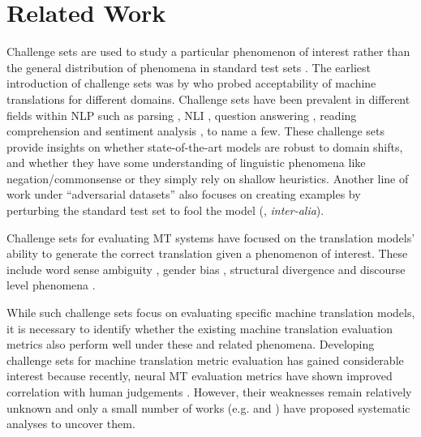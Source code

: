 \documentclass[11pt]{article}
\begin{document}
\section{Related Work}
\label{sec:related_work}
Challenge sets are used to study a particular phenomenon of interest rather than the general distribution of phenomena in standard test sets \citep{popovic-castilho-2019-challenge}. The earliest introduction of challenge sets was by \citet{king-falkedal-1990-using} who probed acceptability of machine translations for different domains. Challenge sets have been prevalent in different fields within NLP such as parsing \citep{rimell-etal-2009-unbounded}, NLI \citep{mccoy2019non,Rocchietti2021FANCYAD}, question answering \citep{ravichander-etal-2021-noiseqa}, reading comprehension \citep{khashabi-etal-2018-looking} and sentiment analysis \citep{li-etal-2017-bibi,mahler-etal-2017-breaking,staliunaite-bonfil-2017-breaking}, to name a few. These challenge sets provide insights on whether state-of-the-art models are robust to domain shifts, and whether they have some understanding of linguistic phenomena like negation/commonsense or they simply rely on shallow heuristics. Another line of work under ``adversarial datasets'' also focuses on creating examples by perturbing the standard test set to fool the model (\citet{DBLP:journals/corr/abs-1207-0245, jia-liang-2017-adversarial},  \textit{inter-alia}).

Challenge sets for evaluating MT systems have focused on the translation models' ability to generate the correct translation given a phenomenon of interest. These include word sense ambiguity \citep{vamvas-sennrich-2021-contrastive}, gender bias \citep{rudinger-etal-2017-social, zhao-etal-2018-gender, stanovsky-etal-2019-evaluating}, structural divergence \citep{isabelle-etal-2017-challenge} and discourse level phenomena \citep{guillou-hardmeier-2016-protest,emelin-sennrich-2021-wino}.


While such challenge sets focus on evaluating specific machine translation models, it is necessary to identify whether the existing machine translation evaluation metrics also perform well under these and related phenomena. Developing challenge sets for machine translation metric evaluation has gained considerable interest because recently, neural MT evaluation metrics have shown improved correlation with human judgements \citep{freitag-etal-2021-results, kocmi-etal-2021-ship}. However, their weaknesses remain relatively unknown and only a small number of works (e.g. \citet {hanna-bojar-2021-fine} and \citet{amrhein2022identifying}) have proposed systematic analyses to uncover them. 
\end{document}

